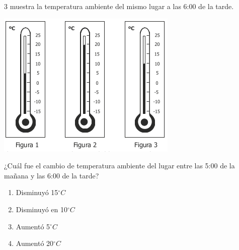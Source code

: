 \documentclass[letterpaper,11pt,twoside]{article}
\begin{document}
\begin{multicols}{2}
\begin{enumerate}
3 muestra la temperatura ambiente del mismo lugar a las 6:00 de la tarde.
\begin{center}
\includegraphics[scale=.7]{Images/Pantallazo-13.png} 
\end{center}
¿Cuál fue el cambio de temperatura ambiente del lugar entre las 5:00 de la mañana y las 6:00 de la tarde?
\begin{enumerate}
\item Disminuyó 15$^{\circ}C $
\item Disminuyó en 10$^{\circ}C$
\item Aumentó 5$^{\circ}C$
\item Aumentó 20$^{\circ}C$
\end{enumerate}
\end{enumerate}
\end{multicols}
\end{document}

